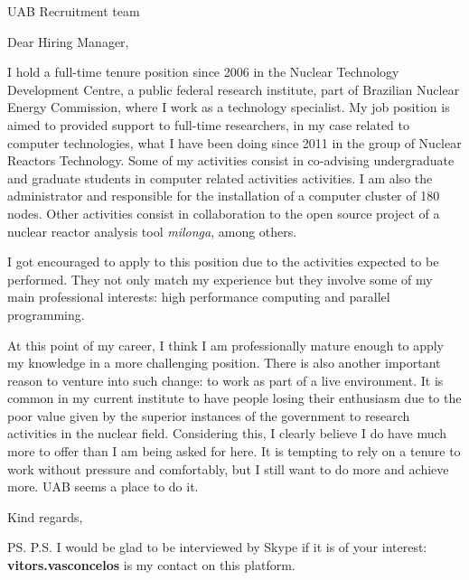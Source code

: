 \documentclass{letter}
\begin{document}
\begin{letter}{UAB Recruitment team}

  \opening{Dear Hiring Manager,}
  
  I hold a full-time tenure position since 2006 in the Nuclear Technology Development Centre, a public federal
  research institute, part of Brazilian Nuclear Energy Commission, where I work as a technology
  specialist. My job position is aimed to provided support to full-time researchers, in my case
  related to computer technologies,  what I have been doing since 2011 in the group of Nuclear Reactors Technology.
  Some of my activities consist in co-advising undergraduate and graduate students in computer related
  activities activities. I am also the administrator and responsible
  for the installation of a computer cluster of 180 nodes.
  Other activities consist in collaboration
  to the open source project of a nuclear reactor analysis tool \textit{milonga}, among others.

  
  I got encouraged to apply to this position due to the activities expected to be performed. They not only
  match my experience but they involve some of my main professional interests: high performance computing
  and parallel programming.
  
  At this point of my career, I think I am professionally mature enough to apply my knowledge in a more
  challenging position. There is also another important reason to venture into such change: to work
  as part of a live environment. %
  It is common in my current institute to have people losing their enthusiasm due to the
  poor value given by the superior instances of the government to research activities in the nuclear field.
  Considering this, I clearly believe I do have much more to offer than I am being asked for here.
  It is tempting to rely on a tenure to work without pressure and comfortably, but I still want to do more and
  achieve more. UAB seems a place to do it.
  
  \closing{Kind regards,}

  \ps
  P.S. I would be glad to be interviewed by Skype if it is of your interest: \textbf{vitors.vasconcelos} is my contact on this
  platform.
  
\end{letter}
\end{document}
